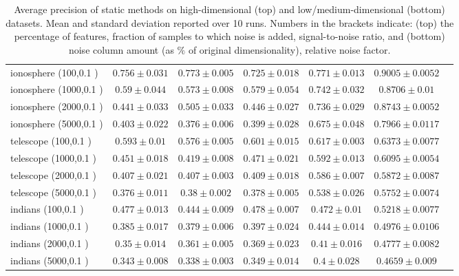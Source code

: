 \begin{footnotesize}
\begin{table}[p!]
\begin{tabular}{lcccccc}
ionosphere (100,0.1 )& $0.756 \pm 0.031$ &  $0.773 \pm 0.005$ &  $0.725 \pm 0.018$ &  $0.771 \pm 0.013$ &  $0.9005 \pm 0.0052$    \\
ionosphere (1000,0.1 )& $0.59 \pm 0.044$ &  $0.573 \pm 0.008$ &  $0.579 \pm 0.054$ &  $0.742 \pm 0.032$ &  $0.8706 \pm 0.01$    \\
ionosphere (2000,0.1 )& $0.441 \pm 0.033$ &  $0.505 \pm 0.033$ &  $0.446 \pm 0.027$ &  $0.736 \pm 0.029$ &  $0.8743 \pm 0.0052$    \\
ionosphere (5000,0.1 )& $0.403 \pm 0.022$ &  $0.376 \pm 0.006$ &  $0.399 \pm 0.028$ &  $0.675 \pm 0.048$ &  $0.7966 \pm 0.0117$    \\
\midrule
telescope (100,0.1 )& $0.593 \pm 0.01$ &  $0.576 \pm 0.005$ &  $0.601 \pm 0.015$ &  $0.617 \pm 0.003$ &  $0.6373 \pm 0.0077$    \\
telescope (1000,0.1 )& $0.451 \pm 0.018$ &  $0.419 \pm 0.008$ &  $0.471 \pm 0.021$ &  $0.592 \pm 0.013$ &  $0.6095 \pm 0.0054$    \\
telescope (2000,0.1 )& $0.407 \pm 0.021$ &  $0.407 \pm 0.003$ &  $0.409 \pm 0.018$ &  $0.586 \pm 0.007$ &  $0.5872 \pm 0.0087$    \\
telescope (5000,0.1 )& $0.376 \pm 0.011$ &  $0.38 \pm 0.002$ &  $0.378 \pm 0.005$ &  $0.538 \pm 0.026$ &  $0.5752 \pm 0.0074$    \\
\midrule
indians (100,0.1 )& $0.477 \pm 0.013$ &  $0.444 \pm 0.009$ &  $0.478 \pm 0.007$ &  $0.472 \pm 0.01$ &  $0.5218 \pm 0.0077$    \\
indians (1000,0.1 )& $0.385 \pm 0.017$ &  $0.379 \pm 0.006$ &  $0.397 \pm 0.024$ &  $0.444 \pm 0.014$ &  $0.4976 \pm 0.0106$    \\
indians (2000,0.1 )& $0.35 \pm 0.014$ &  $0.361 \pm 0.005$ &  $0.369 \pm 0.023$ &  $0.41 \pm 0.016$ &  $0.4777 \pm 0.0082$    \\
indians (5000,0.1 )& $0.343 \pm 0.008$ &  $0.338 \pm 0.003$ &  $0.349 \pm 0.014$ &  $0.4 \pm 0.028$ &  $0.4659 \pm 0.009$    \\
				\bottomrule
		\end{tabular}
		\caption{Average precision of static methods on high-dimensional (top) and low/medium-dimensional (bottom) datasets. Mean and standard deviation reported over 10 runs. Numbers in the brackets indicate: (top) the percentage of features, fraction of samples to which noise is added, signal-to-noise ratio, and (bottom) noise column amount (as $\%$ of original dimensionality), relative noise factor.}
		\label{table:static-results}
\end{table}
\end{footnotesize}

